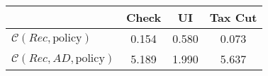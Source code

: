 \begin{tabular}{@{}lccc@{}} 
\toprule 
                          & Check      & UI    & Tax Cut    \\  \midrule 
$\mathcal{C}(Rec,\text{policy})$ & 0.154  & 0.580  & 0.073     \\ 
$\mathcal{C}(Rec, AD,\text{policy})$ & 5.189  & 1.990  & 5.637     \\ 
\end{tabular}  
